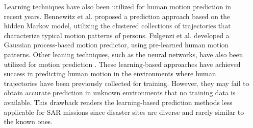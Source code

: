 \documentclass[letterpaper, 10 pt, conference]{ieeeconf}
\newcommand{\todohere}[1]{\hl{(\textbf{TODO:} #1)}}
\begin{document}
	Learning techniques have also been utilized for human motion prediction in recent years. 
	Bennewitz et al. \cite{bennewitz2005learning} proposed a prediction approach based on the hidden Markov model, utilizing the clustered collections of trajectories that characterize typical motion patterns of persons.
	Fulgenzi et al. \cite{fulgenzi2008probabilistic} developed a Gaussian process-based motion predictor, using pre-learned human motion patterns.
	Other leaning techniques, such as the neural networks, have also been utilized for motion prediction \cite{foka2010probabilistic,wu2012path}.
	These learning-based approaches have achieved success in predicting human motion in the environments where human trajectories have been previously collected for training.
	However, they may fail to obtain accurate prediction in unknown environments that no training data is available.
	This drawback renders the learning-based prediction methods less applicable for SAR missions since disaster sites are diverse and rarely similar to the known ones.
	
\end{document}
